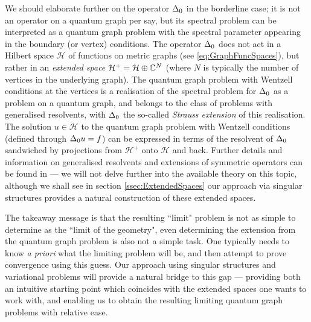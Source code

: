 We should elaborate further on the operator $\Delta_0$ in the borderline case; it is not an operator on a quantum graph per say, but its spectral problem can be interpreted as a quantum graph problem with the spectral parameter appearing in the boundary (or vertex) conditions.
The operator $\Delta_0$ does not act in a Hilbert space $\mathcal{H}$ of functions on metric graphs (see \eqref{eq:GraphFuncSpaces}), but rather in an \emph{extended space} $\mathcal{H}^+ = \mathcal{H}\oplus\mathbb{C}^N$ (where $N$ is typically the number of vertices in the underlying graph).
The quantum graph problem with Wentzell conditions at the vertices is a realisation of the spectral problem for $\Delta_0$ as a problem on a quantum graph, and belongs to the class of problems with generalised resolvents, with $\Delta_0$ the so-called \emph{Strauss extension} of this realisation.
The solution $u\in\mathcal{H}$ to the quantum graph problem with Wentzell conditions (defined through $\Delta_0 u = f$) can be expressed in terms of the resolvent of $\Delta_0$ sandwiched by projections from $\mathcal{H}^+$ onto $\mathcal{H}$ and back.
Further details and information on generalised resolvents and extensions of symmetric operators can be found in \cite{strauss1999function} --- we will not delve further into the available theory on this topic, although we shall see in section \ref{ssec:ExtendedSpaces} our approach via singular structures provides a natural construction of these extended spaces.

The takeaway message is that the resulting ``limit" problem is not as simple to determine as the ``limit of the geometry", even determining the extension from the quantum graph problem is also not a simple task.
One typically needs to know \emph{a priori} what the limiting problem will be, and then attempt to prove convergence using this guess.
Our approach using singular structures and variational problems will provide a natural bridge to this gap --- providing both an intuitive starting point which coincides with the extended spaces one wants to work with, and enabling us to obtain the resulting limiting quantum graph problems with relative ease.

